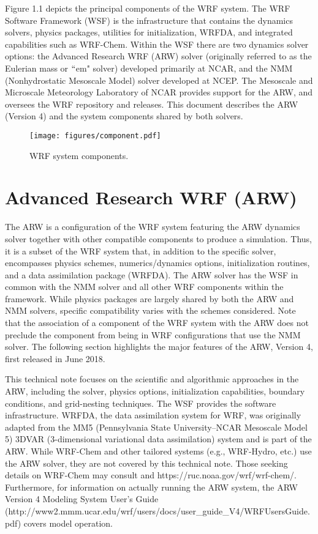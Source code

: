 Figure 1.1 depicts the principal components of the WRF system. 
The WRF Software Framework (WSF) is the infrastructure 
that contains the dynamics solvers, physics packages, utilities
for initialization, WRFDA, and integrated capabilities such as WRF-Chem.  
Within the WSF there are two dynamics solver options: the 
Advanced Research WRF (ARW) solver (originally referred to
as the Eulerian mass or $``$em" solver) developed primarily at NCAR, and
the NMM (Nonhydrostatic Mesoscale Model) solver developed at NCEP.
The Mesoscale and Microscale Meteorology Laboratory of NCAR provides
support for the ARW, and oversees the WRF repository and releases.
This document describes the ARW (Version 4) and the system components 
shared by both solvers.


%
%
\begin{figure}
  \centering
  \texttt{[image: figures/component.pdf]}
  \caption{\label{figure:1}WRF system components.}
\end{figure}

\section {Advanced Research WRF (ARW)}

The ARW is a configuration of the WRF system featuring
the ARW dynamics solver together with other compatible components 
to produce a simulation.  Thus, 
it is a subset of the WRF system that, in addition to the specific solver, 
encompasses physics schemes, numerics/dynamics options, 
initialization routines, and a data assimilation package (WRFDA).  
The ARW solver has the WSF in common with the NMM solver and all other 
WRF components within the framework.  While physics packages are 
largely shared by both the ARW and NMM solvers, specific 
compatibility varies with the schemes considered.  
Note that the association of a component of the WRF system with 
the ARW does not preclude the component from being in
WRF configurations that use the NMM solver.  
The following section highlights the major features of the 
ARW, Version 4, first released in June 2018.

This technical note focuses on the scientific and algorithmic 
approaches in the ARW, including the solver, physics options,
initialization capabilities, boundary conditions, and grid-nesting techniques.  
The WSF provides the software infrastructure.  
WRFDA, the data assimilation system for WRF, was  
originally adapted from the MM5 
(Pennsylvania State University--NCAR Mesoscale Model 5) 
3DVAR (3-dimensional variational data assimilation) system 
\citep{barker04} and is part of the ARW.
While WRF-Chem and other tailored systems 
(e.g., WRF-Hydro, etc.) use the ARW solver, they are 
not covered by this technical note.  Those seeking details on 
WRF-Chem may consult \citet{Grelletal05} and 
https://ruc.noaa.gov/wrf/wrf-chem/.  Furthermore, for information on 
actually running the ARW system, the ARW Version 4 Modeling System User's Guide 
(http://www2.mmm.ucar.edu/wrf/users/docs/user_guide_V4/WRFUsersGuide.pdf) 
covers model operation. 

